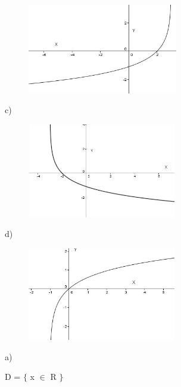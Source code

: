\begin{respostas}{7}
\begin{figure}[H]
	\begin{Center}
		\includegraphics[width=2.58in,height=1.55in]{capitulos/logaritmos_e_funcao_logaritmica/media/image31.JPG}
	\end{Center}
\end{figure}

c)

\begin{figure}[H]
	\begin{Center}
		\includegraphics[width=2.56in,height=1.62in]{capitulos/logaritmos_e_funcao_logaritmica/media/image32.JPG}
	\end{Center}
\end{figure}

d)

\begin{figure}[H]
	\begin{Center}
		\includegraphics[width=2.55in,height=1.61in]{capitulos/logaritmos_e_funcao_logaritmica/media/image33.JPG}
	\end{Center}
\end{figure}

\ansitem{} a)

D = $ \{ $  x $ \in $ R $ \} $ 


\end{respostas}
